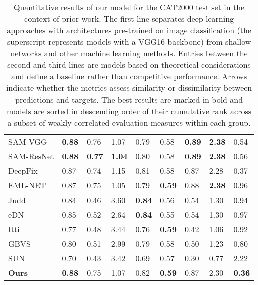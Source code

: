 \documentclass[final,1p,times,number]{elsarticle}
\begin{document}
\begin{table}[t!]
{\begin{tabularx}{17.6cm}{P{4.12cm} Y Y Y Y Y Y Y Y}
    \midrule
    SAM-VGG \citep{Cornia2018PredictingHE} & \textbf{0.88} & 0.76 & 1.07 & 0.79 & 0.58 & \textbf{0.89} & \textbf{2.38} & 0.54 \\
    \addlinespace[0.10em]
    SAM-ResNet \citep{Cornia2018PredictingHE} & \textbf{0.88} & \textbf{0.77} & \textbf{1.04} & 0.80 & 0.58 & \textbf{0.89} & \textbf{2.38} & 0.56 \\
    \addlinespace[0.10em]
    DeepFix \citep{kruthiventi2017deepfix} & 0.87 & 0.74 & 1.15 & 0.81 & 0.58 & 0.87 & 2.28 & 0.37 \\
    \addlinespace[0.10em]
    EML-NET \citep{jia2018eml} & 0.87 & 0.75 & 1.05 & 0.79 & \textbf{0.59} & 0.88 & \textbf{2.38} & 0.96 \\
    \midrule
    Judd \citep{judd2009learning} & 0.84 & 0.46 & 3.60 & \textbf{0.84} & 0.56 & 0.54 & 1.30 & 0.94 \\
    \addlinespace[0.10em]
    eDN \citep{vig2014large} & 0.85 & 0.52 & 2.64 & \textbf{0.84} & 0.55 & 0.54 & 1.30 & 0.97 \\
    \midrule
    Itti \citep{itti1998model} & 0.77 & 0.48 & 3.44 & 0.76 & \textbf{0.59} & 0.42 & 1.06 & 0.92 \\
    \addlinespace[0.10em]
    GBVS \citep{harel2007graph} & 0.80 & 0.51 & 2.99 & 0.79 & 0.58 & 0.50 & 1.23 & 0.80 \\
    \addlinespace[0.10em]
    SUN \citep{zhang2008sun} & 0.70 & 0.43 & 3.42 & 0.69 & 0.57 & 0.30 & 0.77 & 2.22 \\
    \midrule
    \textbf{Ours} & \textbf{0.88} & 0.75 & 1.07 & 0.82 & \textbf{0.59} & 0.87 & 2.30 & \textbf{0.36} \\
    \bottomrule
\end{tabularx}}
\caption{Quantitative results of our model for the CAT2000 test set in the context of prior work. The first line separates deep learning approaches with architectures pre-trained on image classification (the superscript  represents models with a VGG16 backbone) from shallow networks and other machine learning methods. Entries between the second and third lines are models based on theoretical considerations and define a baseline rather than competitive performance. Arrows indicate whether the metrics assess similarity \protect\raisebox{1.0pt}{\protect\scalebox{0.70}{}} or dissimilarity \protect\raisebox{1.0pt}{\protect\scalebox{0.70}{}} between predictions and targets. The best results are marked in bold and models are sorted in descending order of their cumulative rank across a subset of weakly correlated evaluation measures within each group.}
\label{tab:tab2} 
\end{table} 
\end{document}
